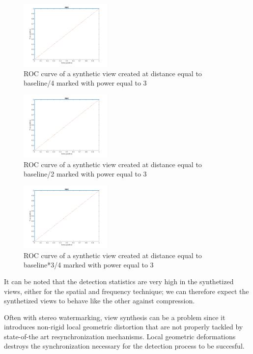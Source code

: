 \begin{figure}[h!]
\centering
\includegraphics[width=0.4\textwidth]{./img/ROC/ROC_gauss_synt_3_25.png}
\caption{\small{ROC curve of a synthetic view created at distance equal to baseline/4 marked with power equal to 3 }}
\label{fig:g3vs25}
\end{figure}
\begin{figure}[h!]
\centering
\includegraphics[width=0.4\textwidth]{./img/ROC/ROC_gauss_synt_3_50.png}
\caption{\small{ROC curve of a synthetic view created at distance equal to baseline/2 marked with power equal to 3 }}
\label{fig:g3vs50}
\end{figure}
\begin{figure}[h!]
\centering
\includegraphics[width=0.4\textwidth]{./img/ROC/ROC_gauss_synt_3_75.png}
\caption{\small{ROC curve of a synthetic view created at distance equal to baseline*3/4 marked with power equal to 3 }}
\label{fig:g3vs75}
\end{figure}
\clearpage
It can be noted that the detection statistics are very high in the synthetized views, either for the spatial and frequency technique; we can therefore expect the synthetized views to behave like the other against compression.\newline

Often with stereo watermarking, view synthesis can be a problem since it introduces non-rigid local geometric distortion that are not properly tackled by state-of-the art resynchronization mechanisms. Local geometric deformations destroys the synchronization necessary for the detection process to be succesful.

